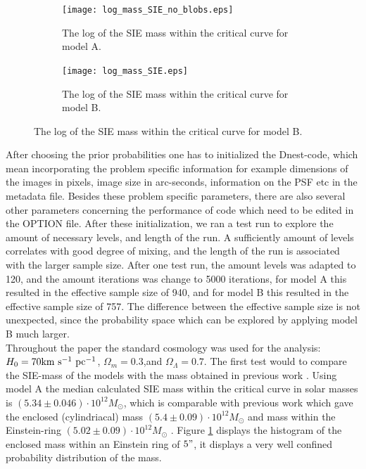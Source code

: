 \documentclass[useAMS,usenatbib]{mn2e}
\begin{document}
 \begin{figure}
\begin{subfigure}{.45\textwidth}
  \centering
  \texttt{[image: log\_mass\_SIE\_no\_blobs.eps]}
\parbox{0.8\linewidth}{\caption{The log of the SIE mass within the critical curve  for model A.  \label{fig:sub1} }}
\end{subfigure}%
\begin{subfigure}{.45\textwidth}
  \centering
  \texttt{[image: log\_mass\_SIE.eps]}
   \parbox{0.8\linewidth}{\caption{The log of the SIE mass within the critical curve for model B.   \label{fig:sub2}}}
\end{subfigure}
   \end{figure}

After choosing the prior probabilities one has to initialized the Dnest-code, which mean incorporating the problem specific information for
 example dimensions of the images in pixels, image size in arc-seconds, information on the PSF etc in the metadata file. 
 Besides these problem specific parameters, there are also several other parameters concerning the performance of code which need to be
  edited in the OPTION file. After these initialization, we ran a test run to explore the amount of necessary levels, and length of the run.
 A sufficiently amount of levels correlates with good degree of mixing, and the length of the run is associated with the larger sample
  size. After one test run, the amount levels was adapted to 120, and the amount iterations was change to 5000 iterations, for model A this resulted in the effective sample size of 940, and for model B this resulted in the effective sample size of 757.  The difference between the effective sample size is not unexpected, since the probability space which can be explored by applying model B much larger.  \\
Throughout the paper the standard cosmology was used for the analysis:  $H_0=70 \rm{km~s^{-1} ~pc^{-1}}$,  $\Omega_m = 0.3$,and  $\Omega_\Lambda= 0.7$. 
The first test would to compare the SIE-mass of the models with the mass obtained in previous  work \cite{Belokurov2007} \cite{Dye2008}.
Using model A the median  calculated SIE mass within the critical curve in solar masses is  $(5.34 \pm 0.046) \cdot 10^{12} M_\odot$, %
which is comparable with previous work which gave the enclosed (cylindriacal) mass $(5.4 \pm 0.09) \cdot 10^{12} M_\odot$ \cite{Belokurov2007} and  mass within the Einstein-ring $(5.02 \pm 0.09) \cdot 10^{12} M_\odot$ \cite{Dye2008}. Figure \ref{fig:sub1} displays the histogram of the enclosed mass within an Einstein ring of $5"$, it displays a very well confined probability distribution of the mass. \\ 
\end{document}
